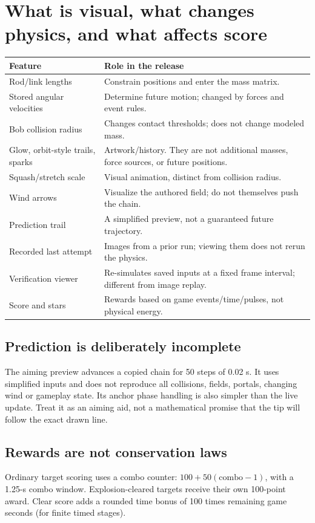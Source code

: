 \documentclass[11pt,a4paper]{article}
\begin{document}
\section{What is visual, what changes physics, and what affects score}
\begin{longtable}{p{.27\linewidth}p{.63\linewidth}}
\toprule\textbf{Feature}&\textbf{Role in the release}\\\midrule\endhead
Rod/link lengths&Constrain positions and enter the mass matrix.\\
Stored angular velocities&Determine future motion; changed by forces and event rules.\\
Bob collision radius&Changes contact thresholds; does not change modeled mass.\\
Glow, orbit-style trails, sparks&Artwork/history. They are not additional masses, force sources, or future positions.\\
Squash/stretch scale&Visual animation, distinct from collision radius.\\
Wind arrows&Visualize the authored field; do not themselves push the chain.\\
Prediction trail&A simplified preview, not a guaranteed future trajectory.\\
Recorded last attempt&Images from a prior run; viewing them does not rerun the physics.\\
Verification viewer&Re-simulates saved inputs at a fixed frame interval; different from image replay.\\
Score and stars&Rewards based on game events/time/pulses, not physical energy.\\\bottomrule
\end{longtable}
\subsection{Prediction is deliberately incomplete}
The aiming preview advances a copied chain for 50 steps of 0.02 s. It uses simplified inputs and does not reproduce all collisions, fields, portals, changing wind or gameplay state. Its anchor phase handling is also simpler than the live update. Treat it as an aiming aid, not a mathematical promise that the tip will follow the exact drawn line.
\subsection{Rewards are not conservation laws}
Ordinary target scoring uses a combo counter: \(100+50(\mathrm{combo}-1)\), with a 1.25-s combo window. Explosion-cleared targets receive their own 100-point award. Clear score adds a rounded time bonus of 100 times remaining game seconds (for finite timed stages).
\end{document}
